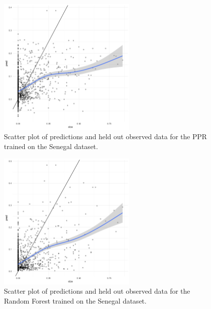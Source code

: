 \documentclass[review]{elsarticle}
\begin{document}
\begin{figure}[h!]
  \centering
  \includegraphics[width=0.6\textwidth]{figs/SI/ppr_obspred_sen.png}
\caption{
  Scatter plot of predictions and held out observed data for the PPR trained on the Senegal dataset.
}

\end{figure}


\begin{figure}[h!]
  \centering
  \includegraphics[width=0.6\textwidth]{figs/SI/ranger_obspred_sen.png}
\caption{
  Scatter plot of predictions and held out observed data for the Random Forest trained on the Senegal dataset.
}

\end{figure}
\end{document}
